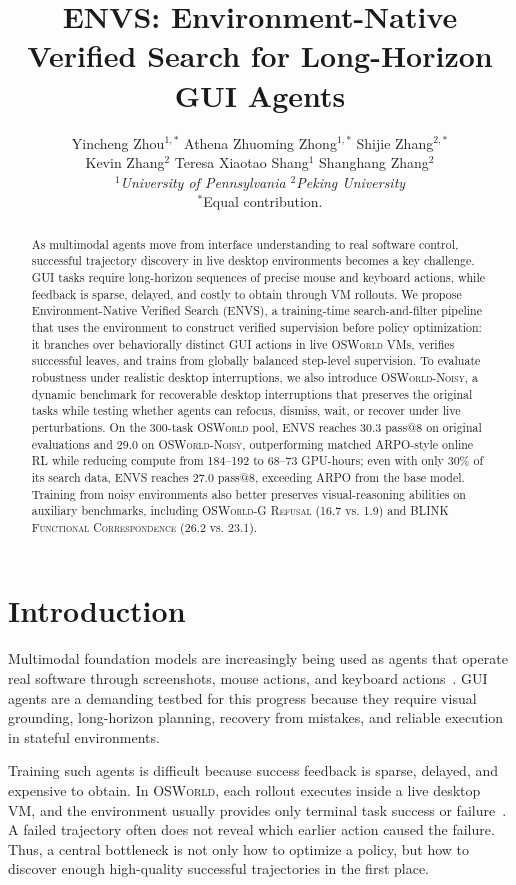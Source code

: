 \documentclass[11pt]{article}
\title{ENVS: Environment-Native Verified Search for Long-Horizon GUI Agents
}
\author{
Yincheng Zhou$^{1,*}$ \quad Athena Zhuoming Zhong$^{1,*}$ \quad Shijie Zhang$^{2,*}$\\
Kevin Zhang$^{2}$ \quad Teresa Xiaotao Shang$^{1}$ \quad Shanghang Zhang$^{2}$\\[0.5em]
\textit{$^{1}$University of Pennsylvania \quad $^{2}$Peking University}\\[0.2em]
\small $^{*}$Equal contribution.
}
\begin{document}
\maketitle

\begin{abstract}
As multimodal agents move from interface understanding to real software control, successful trajectory discovery in live desktop environments becomes a key challenge. GUI tasks require long-horizon sequences of precise mouse and keyboard actions, while feedback is sparse, delayed, and costly to obtain through VM rollouts. We propose Environment-Native Verified Search (\textsc{ENVS}), a training-time search-and-filter pipeline that uses the environment to construct verified supervision before policy optimization: it branches over behaviorally distinct GUI actions in live \textsc{OSWorld} VMs, verifies successful leaves, and trains from globally balanced step-level supervision. To evaluate robustness under realistic desktop interruptions, we also introduce \textsc{OSWorld-Noisy}, a dynamic benchmark for recoverable desktop interruptions that preserves the original tasks while testing whether agents can refocus, dismiss, wait, or recover under live perturbations. On the 300-task \textsc{OSWorld} pool, \textsc{ENVS} reaches 30.3 pass@8 on original evaluations and 29.0 on \textsc{OSWorld-Noisy}, outperforming matched ARPO-style online RL while reducing compute from 184--192 to 68--73 GPU-hours; even with only 30\% of its search data, \textsc{ENVS} reaches 27.0 pass@8, exceeding ARPO from the base model. Training from noisy environments also better preserves visual-reasoning abilities on auxiliary benchmarks, including \textsc{OSWorld-G Refusal} (16.7 vs. 1.9) and \textsc{BLINK Functional Correspondence} (26.2 vs. 23.1).

\end{abstract}

\section{Introduction}
Multimodal foundation models are increasingly being used as agents that operate real software through screenshots, mouse actions, and keyboard actions~\citep{cheng2024seeclick,hong2023cogagent,zhang2024screenagent,qin2025uitars}. GUI agents are a demanding testbed for this progress because they require visual grounding, long-horizon planning, recovery from mistakes, and reliable execution in stateful environments.

Training such agents is difficult because success feedback is sparse, delayed, and expensive to obtain. In \textsc{OSWorld}, each rollout executes inside a live desktop VM, and the environment usually provides only terminal task success or failure~\citep{xie2024osworld}. A failed trajectory often does not reveal which earlier action caused the failure. Thus, a central bottleneck is not only how to optimize a policy, but how to discover enough high-quality successful trajectories in the first place.
\end{document}
